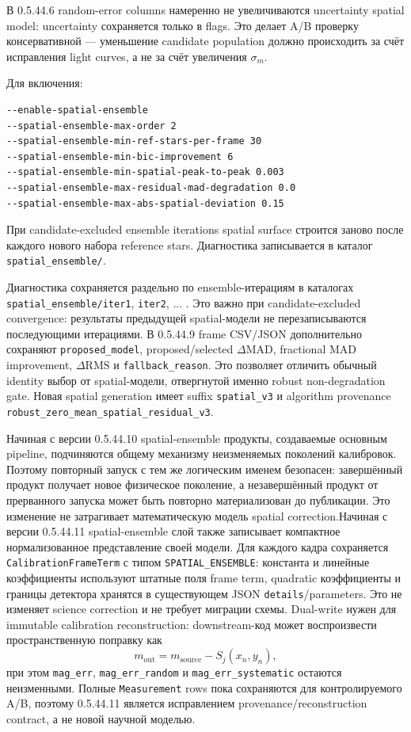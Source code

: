 В 0.5.44.6 random-error columns намеренно не увеличиваются uncertainty spatial model: uncertainty
сохраняется только в flags. Это делает A/B проверку консервативной --- уменьшение candidate
population должно происходить за счёт исправления light curves, а не за счёт увеличения
$\sigma_m$.

Для включения:
\begin{lstlisting}
--enable-spatial-ensemble
--spatial-ensemble-max-order 2
--spatial-ensemble-min-ref-stars-per-frame 30
--spatial-ensemble-min-bic-improvement 6
--spatial-ensemble-min-spatial-peak-to-peak 0.003
--spatial-ensemble-max-residual-mad-degradation 0.0
--spatial-ensemble-max-abs-spatial-deviation 0.15
\end{lstlisting}
При candidate-excluded ensemble iterations spatial surface строится заново после каждого нового
набора reference stars. Диагностика записывается в каталог \texttt{spatial\_ensemble/}.

Диагностика сохраняется раздельно по ensemble-итерациям в каталогах
\texttt{spatial\_ensemble/iter1}, \texttt{iter2}, ... . Это важно при
candidate-excluded convergence: результаты предыдущей spatial-модели не
перезаписываются последующими итерациями. В 0.5.44.9 frame CSV/JSON дополнительно сохраняют
\texttt{proposed\_model}, proposed/selected $\Delta\mathrm{MAD}$, fractional MAD improvement,
$\Delta\mathrm{RMS}$ и \texttt{fallback\_reason}. Это позволяет отличить обычный identity выбор
от spatial-модели, отвергнутой именно robust non-degradation gate. Новая spatial generation имеет
suffix \texttt{spatial\_v3} и algorithm provenance
\texttt{robust\_zero\_mean\_spatial\_residual\_v3}.


Начиная с версии 0.5.44.10 spatial-ensemble продукты, создаваемые основным pipeline,
подчиняются общему механизму неизменяемых поколений калибровок. Поэтому повторный запуск
с тем же логическим именем безопасен: завершённый продукт получает новое физическое поколение,
а незавершённый продукт от прерванного запуска может быть повторно материализован до публикации.
Это изменение не затрагивает математическую модель spatial correction.Начиная с версии 0.5.44.11 spatial-ensemble слой также записывает компактное нормализованное
представление своей модели. Для каждого кадра сохраняется \texttt{CalibrationFrameTerm} с
типом \texttt{SPATIAL\_ENSEMBLE}: константа и линейные коэффициенты используют штатные поля
frame term, quadratic коэффициенты и границы детектора хранятся в существующем JSON
\texttt{details}/parameters. Это не изменяет science correction и не требует миграции схемы.
Dual-write нужен для immutable calibration reconstruction: downstream-код может воспроизвести
пространственную поправку как
\begin{equation}
 m_{\mathrm{out}} = m_{\mathrm{source}} - S_j(x_n,y_n),
\end{equation}
при этом \texttt{mag\_err}, \texttt{mag\_err\_random} и \texttt{mag\_err\_systematic} остаются
неизменными. Полные \texttt{Measurement} rows пока сохраняются для контролируемого A/B, поэтому
0.5.44.11 является исправлением provenance/reconstruction contract, а не новой научной моделью.

